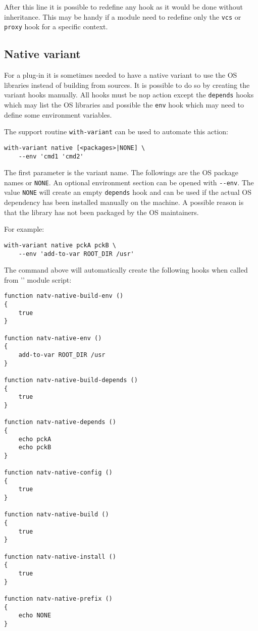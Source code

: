 \documentclass[a4paper,12pt,twoside]{article}
\newcommand{\code}[1]{\texttt{#1}}
\newcommand{\file}[1]{'{\path{#1}}'}
\newcommand{\ddash}{-{}-}
\begin{document}
After this line it is possible to redefine any hook as it would be done
without inheritance. This may be handy if a module need to redefine only
the \code{vcs} or \code{proxy} hook for a specific context.

\subsection{Native variant}
\label{native variant}

For a plug-in it is sometimes needed to have a native variant to use the OS libraries instead of building from sources. It is possible to do so by creating the variant hooks manually. All hooks must be nop action except the \code{depends} hooks which may list the OS libraries and possible the \code{env} hook which may need to define some environment variables.

The support routine \code{with-variant} can be used to automate this action:

\begin{lstlisting}
with-variant native [<packages>|NONE] \
	--env 'cmd1 'cmd2'
\end{lstlisting}

The first parameter is the variant name. The followings are the OS package names or \code{NONE}. An optional environment section can be opened with \code{\ddash{}env}. The value \code{NONE} will create an empty \code{depends} hook and can be used if the actual OS dependency has been installed manually on the machine. A possible reason is that the library has not been packaged by the OS maintainers.

For example:

\begin{lstlisting}
with-variant native pckA pckB \
	--env 'add-to-var ROOT_DIR /usr'
\end{lstlisting}

The command above will automatically create the following hooks when called from \file{natv} module script:

\begin{lstlisting}
function natv-native-build-env ()
{
	true
}

function natv-native-env ()
{
	add-to-var ROOT_DIR /usr
}

function natv-native-build-depends ()
{
	true
}

function natv-native-depends ()
{
	echo pckA
	echo pckB
}

function natv-native-config ()
{
	true
}

function natv-native-build ()
{
	true
}

function natv-native-install ()
{
	true
}

function natv-native-prefix ()
{
	echo NONE
}
\end{lstlisting}
\end{document}
